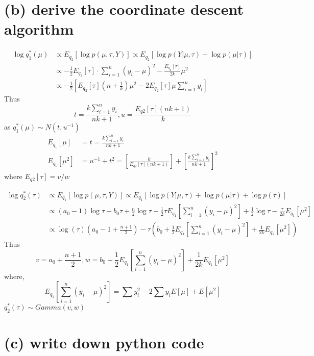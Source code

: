\documentclass[11pt]{article}
\begin{document}
    \section{(b) derive the coordinate descent
algorithm}\label{b-derive-the-coordinate-descent-algorithm}

    \[
\begin{align*}
\log q_1^*(\mu) &\propto E_{q_2}\left[ \log p(\mu,\tau,Y)\right] \propto  E_{q_2}\left[ \log p(Y|\mu,\tau) + \log p(\mu|\tau)\right]\\
&\propto -\frac{1}{2} E_{q_2}[\tau] \cdot \sum_{i=1}^{n}(y_i - \mu)^2 - \frac{E_{q_2}[\tau]}{2k}\mu^2 \\
&\propto -\frac{1}{2} \left[E_{q_2}[\tau]\left(n + \frac{1}{k}\right)\mu^2 -2E_{q_2}[\tau]\mu\sum_{i=1}^{n}y_i \right]
\end{align*}
\] Thus \[
t = \frac{k\sum_{i=1}^{n}y_i}{nk + 1} , u =\frac{E_{q2}[\tau](nk + 1)}{k}
\] as \(q_1^*(\mu) \sim N(t,u^{-1})\) \[
\begin{align*}
E_{q_1}[\mu] &= t = \frac{k\sum_{i=1}^{n}y_i}{nk + 1}\\
E_{q_1}[\mu^2] &= u^{-1} + t^2 = \left[\frac{k}{E_{q2}[\tau](nk + 1)}\right]  + \left[\frac{k\sum_{i=1}^{n}y_i}{nk + 1}\right]^2
\end{align*}
\] where \(E_{q2}[\tau] = v/w\)

    \[
\begin{align*}
\log q_2^*(\tau) &\propto E_{q_1}\left[ \log p(\mu,\tau,Y)\right] \propto  E_{q_1}\left[ \log p(Y|\mu,\tau) + \log p(\mu|\tau) + \log p(\tau)\right]\\
&\propto (a_0-1)\log\tau - b_0 \tau + \frac{n}{2}\log\tau - \frac{1}{2}\tau E_{q_1}\left[\sum_{i=1}^{n}(y_i - \mu)^2 \right] + \frac{1}{2}\log \tau -\frac{\tau}{2k}E_{q_1}\left[\mu^2\right]\\
&\propto \log(\tau)\left(a_0-1 +\frac{n+1}{2}\right) - \tau \left(b_0 + \frac{1}{2}  E_{q_1}\left[\sum_{i=1}^{n}(y_i - \mu)^2 \right] + \frac{1}{2k}E_{q_1}\left[\mu^2\right]\right)
\end{align*}
\] Thus \[
v = a_0 +\frac{n+1}{2} , w =b_0 + \frac{1}{2}  E_{q_1}\left[\sum_{i=1}^{n}(y_i - \mu)^2 \right] + \frac{1}{2k}E_{q_1}\left[\mu^2\right]
\] where, \[
 E_{q_1}\left[\sum_{i=1}^{n}(y_i - \mu)^2 \right] = \sum y_i^2 - 2\sum y_i E[\mu] + E[\mu^2]
\] \(q_2^*(\tau) \sim Gamma(v,w)\)

    \section{(c) write down python code}\label{c-write-down-python-code}
\end{document}

